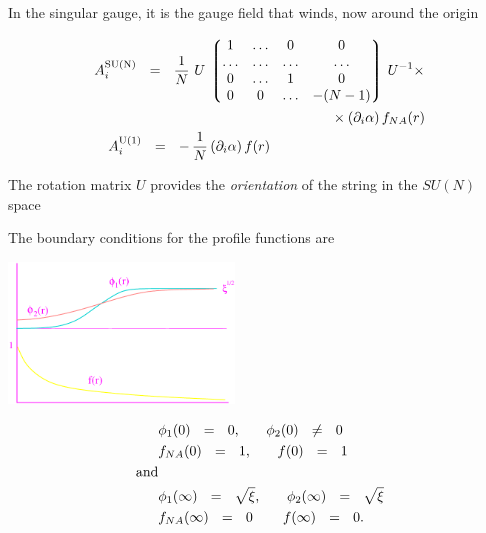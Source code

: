 \documentclass[12pt,letterpaper,landscape,KOMA,smallheadings,calcdimensions,display]{powersem}
\begin{document}
\begin{slide}

	In the singular gauge, it is the gauge field that winds, now around the origin

\begin{align*}
%
	A_i^{\rm SU(N)} ~~=~~ \frac{1}{N}\, &\, U\, \lgr \begin{matrix}
					          	1  & \ldots & 0 & 0 \\
						  	\ldots & \ldots & \ldots & \ldots \\
							0  & \ldots  & 1  &  0 \\
							0  & 0   & \ldots  &  - (N-1) 
					         \end{matrix} \rgr  \, U^{-1} \times \\
%
			&	\qquad\qquad\qquad\qquad\qquad     \times(\p_i \alpha)\, f_{NA}(r)  \\
%
	A_i^{\rm U(1)} ~~=~~ -\, & \frac{1}{N}\, (\p_i \alpha)\, f(r) 
\end{align*}

	The rotation matrix $U$ provides the {\it orientation} of the string in the $ SU(N) $ space
\end{slide}


\begin{slide}
	The boundary conditions for the profile functions are

\begin{center}
\includegraphics[width=6.0cm]{profiles.pdf}
\end{center}
\begin{align*}
%
	& \phi_1(0) ~~=~~ 0\text, \qquad  \phi_2(0) ~~\neq~~ 0 \\
%
	& f_{NA}(0) ~~=~~ 1\text, \qquad  f(0) ~~=~~ 1\\
%
	\text{and} \\
%
	& \phi_1(\infty) ~~=~~ \sqrt{\xi} \text, \qquad \phi_2(\infty) ~~=~~ \sqrt{\xi} \\
%
	& f_{NA}(\infty) ~~=~~ 0 \text\, \qquad f(\infty) ~~=~~ 0\text.
\end{align*}

\end{slide}
\end{document}

